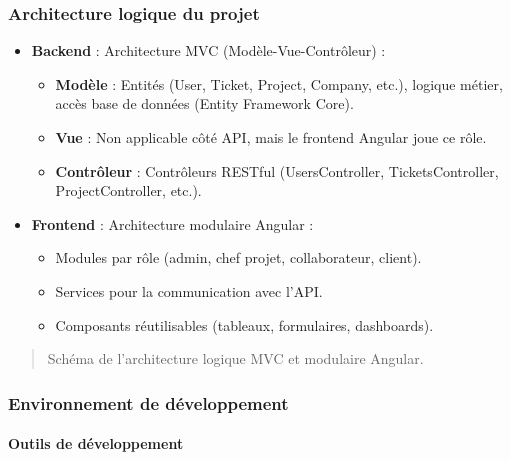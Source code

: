 \subsubsection{Architecture logique du projet}
\label{sec:architecture-logique}
\begin{itemize}
    \item \textbf{Backend} : Architecture MVC (Modèle-Vue-Contrôleur) :
    \begin{itemize}
        \item \textbf{Modèle} : Entités (User, Ticket, Project, Company, etc.), logique métier, accès base de données (Entity Framework Core).
        \item \textbf{Vue} : Non applicable côté API, mais le frontend Angular joue ce rôle.
        \item \textbf{Contrôleur} : Contrôleurs RESTful (UsersController, TicketsController, ProjectController, etc.).
    \end{itemize}
    \item \textbf{Frontend} : Architecture modulaire Angular :
    \begin{itemize}
        \item Modules par rôle (admin, chef projet, collaborateur, client).
        \item Services pour la communication avec l'API.
        \item Composants réutilisables (tableaux, formulaires, dashboards).
    \end{itemize}
\end{itemize}

\begin{quote}
    Schéma de l'architecture logique MVC et modulaire Angular.
\end{quote}

\subsubsection{Environnement de développement}
\label{sec:environnement-de-developpement}

\paragraph{Outils de développement}
\label{sec:outils-de-developpement}

